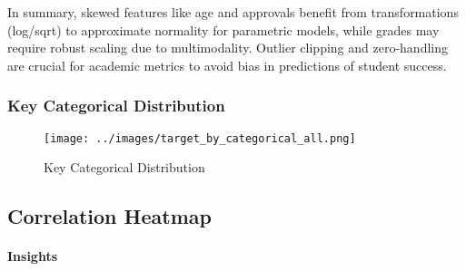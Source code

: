 \documentclass[twoside,final]{hcmut-report}
\begin{document}
In summary, skewed features like age and approvals benefit from transformations (log/sqrt) to approximate normality for parametric models, while grades may require robust scaling due to multimodality. Outlier clipping and zero-handling are crucial for academic metrics to avoid bias in predictions of student success.

\subsubsection{Key Categorical Distribution}

\begin{figure}[H]
  \centering
  \texttt{[image: ../images/target\_by\_categorical\_all.png]}
  \caption{Key Categorical Distribution}
  \label{cat_dist_dist}
\end{figure}
\subsection{Correlation Heatmap}
\paragraph{Insights}
\end{document}
